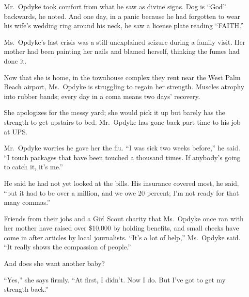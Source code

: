 ﻿\documentclass[12pt]{article}
\begin{document}
Mr.~Opdyke took comfort from what he saw as divine signs. Dog is ``God'' backwards, he noted. And
one day, in a panic because he had forgotten to wear his wife's wedding ring around his neck, he saw
a license plate reading ``FAITH.''

Ms.~Opdyke's last crisis was a still-unexplained seizure during a family visit. Her mother had been
painting her nails and blamed herself, thinking the fumes had done it.

Now that she is home, in the townhouse complex they rent near the West Palm Beach airport,
Ms.~Opdyke is struggling to regain her strength. Muscles atrophy into rubber bands; every day in a
coma means two days' recovery.

She apologizes for the messy yard; she would pick it up but barely has the strength to get upstairs
to bed. Mr.~Opdyke has gone back part-time to his job at UPS.

Mr.~Opdyke worries he gave her the flu. ``I was sick two weeks before,'' he said. ``I touch packages
that have been touched a thousand times. If anybody's going to catch it, it's me.''

He said he had not yet looked at the bills. His insurance covered most, he said, ``but it had to be
over a million, and we owe 20 percent; I'm not ready for that many commas.''

Friends from their jobs and a Girl Scout charity that Ms.~Opdyke once ran with her mother have
raised over \$10,000 by holding benefits, and small checks have come in after articles by local
journalists. ``It's a lot of help,'' Ms.~Opdyke said. ``It really shows the compassion of people.''

And does she want another baby?

``Yes,'' she says firmly. ``At first, I didn't. Now I do. But I've got to get my strength back.''


\vocabulary
\end{document}
